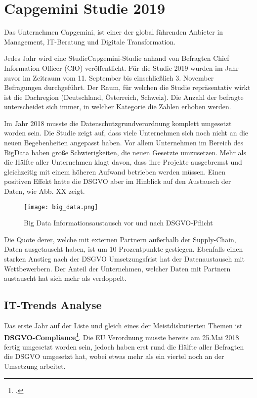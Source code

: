 \section{Capgemini Studie 2019}
Das Unternehmen Capgemini, ist einer der global führenden Anbieter in Management, IT-Beratung und Digitale Transformation.

Jedes Jahr wird eine StudieCapgemini-Studie anhand von Befragten Chief Information Officer (CIO) veröffentlicht. Für die Studie 2019 wurden im Jahr zuvor im Zeitraum vom 11. September bis einschließlich 3. November Befragungen durchgeführt. Der Raum, für welchen die Studie repräsentativ wirkt ist die Dachregion (Deutschland, Österreich, Schweiz). Die Anzahl der befragte unterscheidet sich immer, in welcher Kategorie die Zahlen erhoben werden.

Im Jahr 2018 musste die Datenschutzgrundverordnung komplett umgesetzt worden sein. Die Studie zeigt auf, dass viele Unternehmen sich noch nicht an die neuen Begebenheiten angepasst haben. Vor allem Unternehmen im Bereich des BigData haben große Schwierigkeiten, die neuen Gesetzte umzusetzen. Mehr als die Hälfte aller Unternehmen klagt davon, dass ihre Projekte ausgebremst und gleichzeitig mit einem höheren Aufwand betrieben werden müssen.
Einen positiven Effekt hatte die DSGVO aber im Hinblick auf den Austausch der Daten, wie Abb. XX zeigt.

\begin{center}
\begin{figure}[h]
    \centering
    \texttt{[image: big\_data.png]}
    \caption{Big Data Informationsaustausch vor und nach DSGVO-Pflicht}
\end{figure}
\end{center}

Die Quote derer, welche mit externen Partnern außerhalb der Supply-Chain, Daten ausgetauscht haben, ist um 10 Prozentpunkte gestiegen. Ebenfalls einen starken Anstieg nach der DSGVO Umsetzungsfrist hat der Datenaustausch mit Wettbewerbern. Der Anteil der Unternehmen, welcher Daten mit Partnern austauscht hat sich mehr als verdoppelt.

\subsection{IT-Trends Analyse}
Das erste Jahr auf der Liste und gleich eines der Meistdiskutierten Themen ist \textbf{DSGVO-Compliance}\footcite{Capgemini-Studie}. Die EU Verordnung musste bereits am 25.Mai 2018 fertig umgesetzt worden sein, jedoch haben erst rund die Hälfte aller Befragten die DSGVO umgesetzt hat, wobei etwas mehr als ein viertel noch an der Umsetzung arbeitet.

